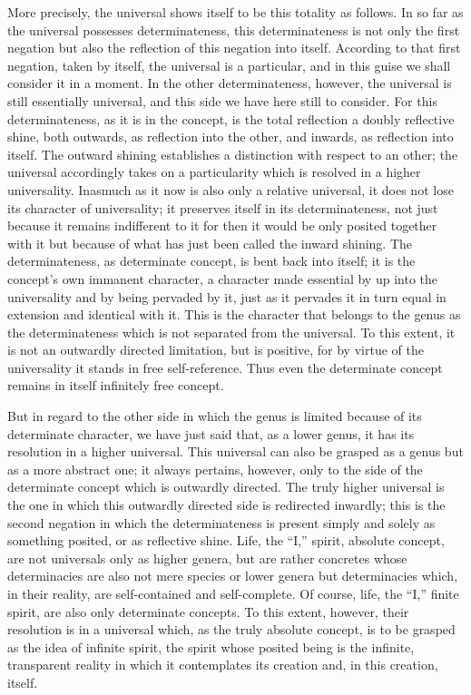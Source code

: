 More precisely, the universal shows itself
to be this totality as follows.
In so far as the universal possesses determinateness,
this determinateness is not only the first negation
but also the reflection of this negation into itself.
According to that first negation, taken by itself,
the universal is a particular,
and in this guise we shall consider it in a moment.
In the other determinateness, however,
the universal is still essentially universal,
and this side we have here still to consider.
For this determinateness, as it is in the concept,
is the total reflection a doubly reflective shine,
both outwards, as reflection into the other,
and inwards, as reflection into itself.
The outward shining establishes a distinction
with respect to an other;
the universal accordingly takes on a particularity
which is resolved in a higher universality.
Inasmuch as it now is also only a relative universal,
it does not lose its character of universality;
it preserves itself in its determinateness,
not just because it remains indifferent to it
for then it would be only posited together with it
but because of what has just been called the inward shining.
The determinateness, as determinate concept,
is bent back into itself;
it is the concept's own immanent character,
a character made essential by
up into the universality
and by being pervaded by it,
just as it pervades it in turn
equal in extension and identical with it.
This is the character that belongs to the genus
as the determinateness which is not
separated from the universal.
To this extent, it is not an outwardly directed limitation,
but is positive, for by virtue of the universality
it stands in free self-reference.
Thus even the determinate concept remains
in itself infinitely free concept.

But in regard to the other side
in which the genus is limited
because of its determinate character,
we have just said that, as a lower genus,
it has its resolution in a higher universal.
This universal can also be grasped as a genus
but as a more abstract one;
it always pertains, however, only to
the side of the determinate concept
which is outwardly directed.
The truly higher universal is the one in which
this outwardly directed side is redirected inwardly;
this is the second negation in which
the determinateness is present simply and solely
as something posited, or as reflective shine.
Life, the “I,” spirit, absolute concept,
are not universals only as higher genera,
but are rather concretes whose determinacies are
also not mere species or lower genera
but determinacies which, in their reality,
are self-contained and self-complete.
Of course, life, the “I,” finite spirit,
are also only determinate concepts.
To this extent, however, their resolution is
in a universal which, as the truly absolute concept,
is to be grasped as the idea of infinite spirit,
the spirit whose posited being is
the infinite, transparent reality
in which it contemplates its creation
and, in this creation, itself.

